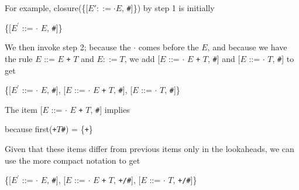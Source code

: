 \documentclass[8pt,a4paper,compress]{beamer}
\newcommand{\mm}[1]{$#1$}
\newcommand{\expo}[2]{$#1^{#2}$}
\newenvironment{spaced}
{
\smallskip
\hspace{.5cm}
\begin{minipage}[c]{\textwidth}
}
{
\end{minipage}
\smallskip
}
\begin{document}
\begin{frame}[fragile]
\pause

For example, closure(\{[$E' ::= \cdot E$, \lstinline{#}]\}) by step 1 is initially

\text{ }
\begin{spaced}
\begin{production}
\{[\expo{E}{\prime} ::= \mm{\cdot} \mm{E}, \lstinline{#}]\}
\end{production}
\end{spaced}

\pause

We then invoke step 2; because the $\cdot$ comes before the $E$, and because we have the rule $E$ ::= $E$ \lstinline{+} $T$ and $E ::= T$, we add [$E$ ::= $\cdot$ $E$ \lstinline{+} $T$, \lstinline{#}] and [$E$ ::= $\cdot$ $T$, \lstinline{#}] to get

\text{ }
\begin{spaced}
\begin{production}
\{[\expo{E}{\prime} ::= \mm{\cdot} \mm{E}, \lstinline{#}],
  [\mm{E}  ::= \mm{\cdot} \mm{E} \lstinline{+} \mm{T}, \lstinline{#}],
  [\mm{E}  ::= \mm{\cdot} \mm{T}, \lstinline{#}]\}
\end{production}
\end{spaced}

\pause

The item [$E$ ::= $\cdot$ $E$ \lstinline{+} $T$, \lstinline{#}] implies

\text{ }
\begin{spaced}
\begin{production}
[\mm{E}  ::= \mm{\cdot} \mm{E} \lstinline{+} \mm{T}, \lstinline{+}]
[\mm{E}  ::= \mm{\cdot} \mm{T}, \lstinline{+}]
\end{production}
\end{spaced}

\pause

\noindent because first(\lstinline{+}$T$\lstinline{#}) = \{\lstinline{+}\}

\pause
\bigskip

Given that these items differ from previous items only in the lookaheads, we can use the more compact notation to get

\text{ }
\begin{spaced}
\begin{production}
\{[\expo{E}{\prime} ::= \mm{\cdot} \mm{E}, \lstinline{#}],
  [\mm{E}  ::= \mm{\cdot} \mm{E} \lstinline{+} \mm{T}, \lstinline{+/#}],
  [\mm{E}  ::= \mm{\cdot} \mm{T}, \lstinline{+/#}]\}
\end{production}
\end{spaced}
\end{frame}
\end{document}
